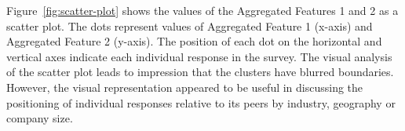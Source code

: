 \documentclass{article}
\newcommand{\myremark}[1]{{#1}}
\newcommand{\ikremark}[1]{\myremark{\color{blue} [Ivan: #1]}}
\begin{document}


Figure~\ref{fig:scatter-plot} shows the values of the Aggregated Features 1 and 2 as a scatter plot. The dots represent values of Aggregated Feature 1 (x-axis) and Aggregated Feature 2 (y-axis). The position of each dot on the horizontal and vertical axes indicate each individual response in the survey.
The visual analysis of the scatter plot leads to impression that the clusters have blurred boundaries. However, the visual representation appeared to be useful in discussing the positioning of individual responses relative to its peers by industry, geography or company size.
%
\end{document}
